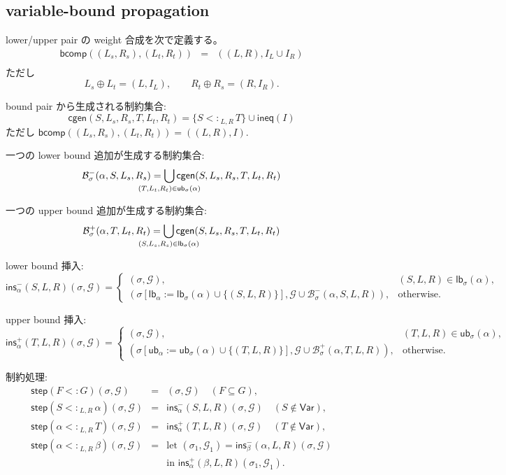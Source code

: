 \documentclass[uplatex,dvipdfmx,a4paper,11pt]{jsarticle}
\theoremstyle{jpplain}
\newcommand{\ub}{\mathsf{ub}}
\newcommand{\lb}{\mathsf{lb}}
\newcommand{\subty}[3]{#1\mathrel{<:}_{#2,#3}}
\newcommand{\compose}{\mathbin{\oplus}}
\begin{document}
\subsection{variable-bound propagation}

lower/upper pair の weight 合成を次で定義する。
\[
\begin{array}{rcl}
\mathsf{bcomp}((L_s,R_s),(L_t,R_t))
 &=&
 ((L,R),I_L\cup I_R)\\[0.2em]
\end{array}
\]
ただし
\[
  L_s\compose L_t=(L,I_L),
  \qquad
  R_t\compose R_s=(R,I_R).
\]

bound pair から生成される制約集合:
\[
\mathsf{cgen}(S,L_s,R_s,T,L_t,R_t)
=
\{\subty{S}{L}{R}\,T\}\cup\mathsf{ineq}(I)
\]
ただし \(\mathsf{bcomp}((L_s,R_s),(L_t,R_t))=((L,R),I)\).

一つの lower bound 追加が生成する制約集合:
\[
\mathcal B^-_\sigma(\alpha,S,L_s,R_s)=
\bigcup_{\mathclap{(T,L_t,R_t)\in\ub_\sigma(\alpha)}}
\mathsf{cgen}(S,L_s,R_s,T,L_t,R_t)
\]

一つの upper bound 追加が生成する制約集合:
\[
\mathcal B^+_\sigma(\alpha,T,L_t,R_t)=
\bigcup_{\mathclap{(S,L_s,R_s)\in\lb_\sigma(\alpha)}}
\mathsf{cgen}(S,L_s,R_s,T,L_t,R_t)
\]

lower bound 挿入:
\[
\mathsf{ins}^-_\alpha(S,L,R)(\sigma,\mathcal G)=
\begin{cases}
(\sigma,\mathcal G),
  & (S,L,R)\in\lb_\sigma(\alpha),\\
(\sigma[\lb_\alpha:=\lb_\sigma(\alpha)\cup\{(S,L,R)\}],
 \mathcal G\cup\mathcal B^-_\sigma(\alpha,S,L,R)),
  & \text{otherwise}.
\end{cases}
\]

upper bound 挿入:
\[
\mathsf{ins}^+_\alpha(T,L,R)(\sigma,\mathcal G)=
\begin{cases}
(\sigma,\mathcal G),
  & (T,L,R)\in\ub_\sigma(\alpha),\\
(\sigma[\ub_\alpha:=\ub_\sigma(\alpha)\cup\{(T,L,R)\}],
 \mathcal G\cup\mathcal B^+_\sigma(\alpha,T,L,R)),
  & \text{otherwise}.
\end{cases}
\]

制約処理:
\[
\begin{array}{rcl}
\mathsf{step}(F<:G)(\sigma,\mathcal G)
  &=& (\sigma,\mathcal G)\quad(F\subseteq G),\\[0.3em]
\mathsf{step}(\subty{S}{L}{R}\,\alpha)(\sigma,\mathcal G)
  &=& \mathsf{ins}^-_\alpha(S,L,R)(\sigma,\mathcal G)
      \quad(S\notin\mathsf{Var}),\\[0.3em]
\mathsf{step}(\subty{\alpha}{L}{R}\,T)(\sigma,\mathcal G)
  &=& \mathsf{ins}^+_\alpha(T,L,R)(\sigma,\mathcal G)
      \quad(T\notin\mathsf{Var}),\\[0.3em]
\mathsf{step}(\subty{\alpha}{L}{R}\,\beta)(\sigma,\mathcal G)
  &=&
  \text{let }(\sigma_1,\mathcal G_1)=
      \mathsf{ins}^-_\beta(\alpha,L,R)(\sigma,\mathcal G)\\
  && \text{in }\mathsf{ins}^+_\alpha(\beta,L,R)(\sigma_1,\mathcal G_1).
\end{array}
\]
\end{document}
